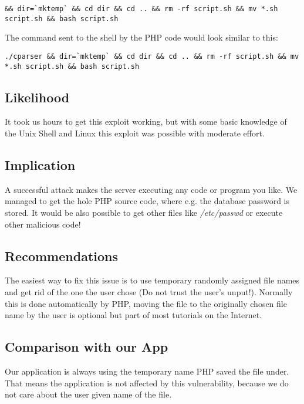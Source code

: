 \begin{lstlisting}[caption=Complete File Name, label=listing:complete_file_name]
&& dir=`mktemp` && cd dir && cd .. && rm -rf script.sh && mv *.sh script.sh && bash script.sh
\end{lstlisting}

The command sent to the shell by the PHP code would look similar to this:

\begin{lstlisting}[caption=Shell Command executed by PHP, label=listing:shell_comannd]
./cparser && dir=`mktemp` && cd dir && cd .. && rm -rf script.sh && mv *.sh script.sh && bash script.sh
\end{lstlisting}

\subsection{Likelihood}
It took us hours to get this exploit working, but with some basic knowledge of the Unix Shell and Linux this exploit was possible with moderate effort.

\subsection{Implication}
A successful attack makes the server executing any code or program you like. We managed to get the hole PHP source code, where e.g. the database password is stored. It would be also possible to get other files like \textit{/etc/passwd} or execute other malicious code!

\subsection{Recommendations}
The easiest way to fix this issue is to use temporary randomly assigned file names and get rid of the one the user chose (Do not trust the user's unput!). Normally this is done automatically by PHP, moving the file to the originally chosen file name by the user is optional but part of most tutorials on the Internet.

\subsection{Comparison with our App}
Our application is always using the temporary name PHP saved the file under. That means the application is not affected by this vulnerability, because we do not care about the user given name of the file.